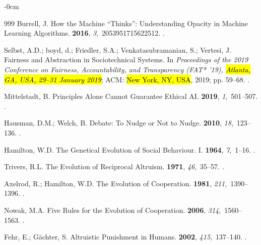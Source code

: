 \documentclass[mca,article,accept,pdftex,oneauthor]{Definitions/mdpi}
\begin{document}
\begin{adjustwidth}{-\extralength}{0cm}
\begin{thebibliography}{999}
Burrell, J.
\newblock How the Machine ``Thinks'': Understanding Opacity in Machine Learning
  Algorithms.
 {\bf 2016}, {\em 3},~2053951715622512.
.

Selbst, A.D.; boyd, d.; Friedler, S.A.; Venkatasubramanian, S.; Vertesi, J.
\newblock Fairness and Abstraction in Sociotechnical Systems.
\newblock In \emph{Proceedings of the 2019 Conference on Fairness, Accountability,
  and Transparency (FAT* '19), \hl{Atlanta, GA, USA, 29--31 January 2019}}; ACM: \hl{New York, NY, USA}, 2019; pp. 59--68.
.

Mittelstadt, B.
\newblock Principles Alone Cannot Guarantee Ethical {AI}.
 {\bf 2019}, {\em 1},~501--507.
.

Hausman, D.M.; Welch, B.
\newblock Debate: To Nudge or Not to Nudge.
 {\bf 2010}, {\em 18},~123--136.
.

Hamilton, W.D.
\newblock The Genetical Evolution of Social Behaviour. I.
 {\bf 1964}, {\em 7},~1--16.
.

Trivers, R.L.
\newblock The Evolution of Reciprocal Altruism.
 {\bf 1971}, {\em 46},~35--57.
.

Axelrod, R.; Hamilton, W.D.
\newblock The Evolution of Cooperation.
 {\bf 1981}, {\em 211},~1390--1396.
.

Nowak, M.A.
\newblock Five Rules for the Evolution of Cooperation.
 {\bf 2006}, {\em 314},~1560--1563.
.

Fehr, E.; G{\"a}chter, S.
\newblock Altruistic Punishment in Humans.
 {\bf 2002}, {\em 415},~137--140.
.


\end{thebibliography}
\end{adjustwidth}
\end{document}
